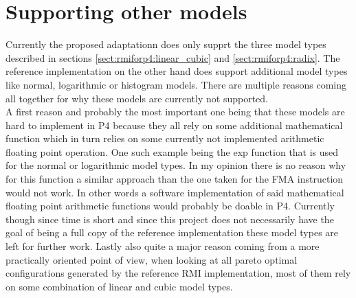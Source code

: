\section{Supporting other models}
Currently the proposed adaptationn does only supprt the three model types described in sections \ref{sect:rmiforp4:linear_cubic} and \ref{sect:rmiforp4:radix}. The reference implementation on the other hand does support additional model types like normal, logarithmic or histogram models. There are multiple reasons coming all together for why these models are currently not supported.\\

A first reason and probably the most important one being that these models are hard to implement in P4 because they all rely on some additional mathematical function which in turn relies on some currently not implemented arithmetic floating point operation. One such example being the exp function that is used for the normal or logarithmic model types. In my opinion there is no reason why for this function a similar approach than the one taken for the FMA instruction would not work. In other words a software implementation of said mathematical floating point arithmetic functions would probably be doable in P4. Currently though since time is short and since this project does not necessarily have the goal of being a full copy of the reference implementation these model types are left for further work. Lastly also quite a major reason coming from a more practically oriented point of view, when looking at all pareto optimal configurations generated by the reference RMI implementation, most of them rely on some combination of linear and cubic model types.
